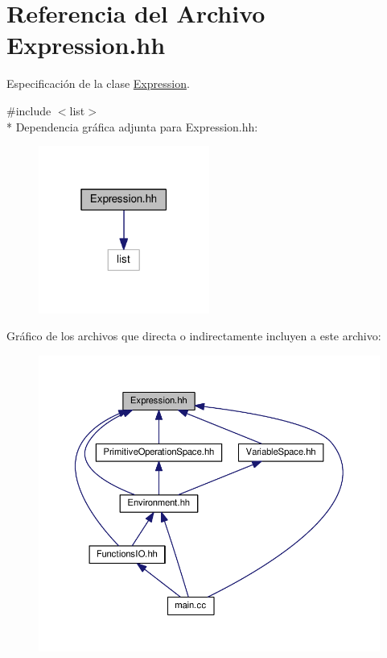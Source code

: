 \hypertarget{_expression_8hh}{}\section{Referencia del Archivo Expression.\+hh}
\label{_expression_8hh}


Especificación de la clase \hyperlink{class_expression}{Expression}.  


{\ttfamily \#include $<$list$>$}\\*
Dependencia gráfica adjunta para Expression.\+hh\+:\nopagebreak
\begin{figure}[H]
\begin{center}
\leavevmode
\includegraphics[width=159pt]{_expression_8hh__incl}
\end{center}
\end{figure}
Gráfico de los archivos que directa o indirectamente incluyen a este archivo\+:\nopagebreak
\begin{figure}[H]
\begin{center}
\leavevmode
\includegraphics[width=350pt]{_expression_8hh__dep__incl}
\end{center}
\end{figure}
